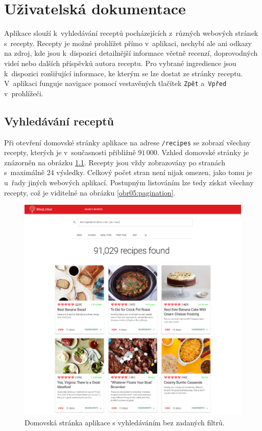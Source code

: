 \chapter{Uživatelská dokumentace}

Aplikace slouží k~vyhledávání receptů pocházejících z~různých webových stránek s~recepty. Recepty je možné prohlížet přímo v~aplikaci, nechybí ale ani odkazy na zdroj, kde jsou k~dispozici detailnější informace včetně recenzí, doprovodných videí nebo dalších příspěvků autora receptu. Pro vybrané ingredience jsou k~dispozici rozšiřující informace, ke kterým se lze dostat ze stránky receptu. V~aplikaci funguje navigace pomocí vestavěných tlačítek \texttt{Zpět} a~\texttt{Vpřed} v~prohlížeči. 

\section{Vyhledávání receptů}

Při otevření domovské stránky aplikace na adrese \texttt{/recipes} se zobrazí všechny recepty, kterých je v~současnosti přibližně $91\,000$. Vzhled domovské stránky je znázorněn na obrázku \ref{obr05:homepage}. Recepty jsou vždy zobrazovány po stranách s~maximálně $24$ výsledky. Celkový počet stran není nijak omezen, jako tomu je u~řady jiných webových aplikací. Postupným listováním lze tedy získat všechny recepty, což je viditelné na obrázku \ref{obr05:pagination}.

\begin{figure}[h!]\centering
\includegraphics[width=140mm]{../img/homepage}
\caption{Domovská stránka aplikace s vyhledáváním bez zadaných filtrů.}
\label{obr05:homepage}
\end{figure}

